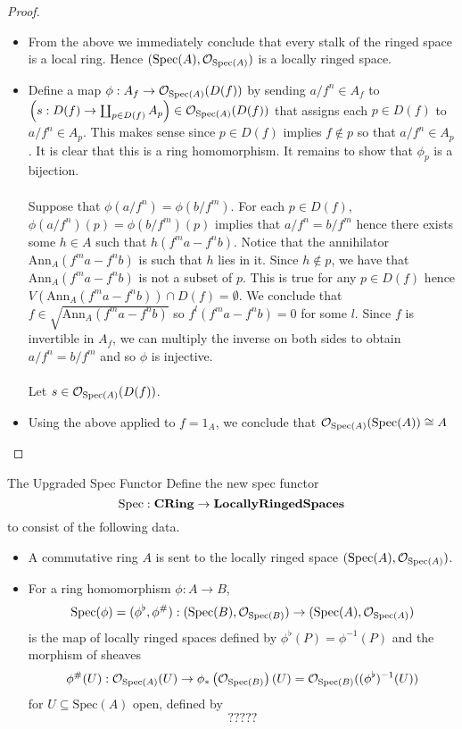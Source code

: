 \documentclass[a4paper]{article}
\begin{document}
\begin{prp}{}{}
\begin{proof}
\begin{itemize}
\item From the above we immediately conclude that every stalk of the ringed space is a local ring. Hence $(\text{Spec}(A),\mathcal{O}_{\text{Spec}(A)})$ is a locally ringed space. 

\item Define a map $\phi:A_f\to\mathcal{O}_{\text{Spec}(A)}(D(f))$ by sending $a/f^n\in A_f$ to $\left(s:D(f)\to\coprod_{p\in D(f)}A_p\right)\in\mathcal{O}_{\text{Spec}(A)}(D(f))$ that assigns each $p\in D(f)$ to $a/f^n\in A_p$. This makes sense since $p\in D(f)$ implies $f\notin p$ so that $a/f^n\in A_p$. It is clear that this is a ring homomorphism. It remains to show that $\phi_p$ is a bijection. \\~\\

Suppose that $\phi(a/f^n)=\phi(b/f^m)$. For each $p\in D(f)$, $\phi(a/f^n)(p)=\phi(b/f^m)(p)$ implies that $a/f^n=b/f^m$ hence there exists some $h\in A$ such that $h(f^ma-f^nb)$. Notice that the annihilator $\text{Ann}_A(f^ma-f^nb)$ is such that $h$ lies in it. Since $h\notin p$, we have that $\text{Ann}_A(f^ma-f^nb)$ is not a subset of $p$. This is true for any $p\in D(f)$ hence $V(\text{Ann}_A(f^ma-f^nb))\cap D(f)=\emptyset$. We conclude that $f\in\sqrt{\text{Ann}_A(f^ma-f^nb)}$ so $f^l(f^ma-f^nb)=0$ for some $l$. Since $f$ is invertible in $A_f$, we can multiply the inverse on both sides to obtain $a/f^n=b/f^m$ and so $\phi$ is injective. \\~\\

Let $s\in\mathcal{O}_{\text{Spec}(A)}(D(f))$. 

\item Using the above applied to $f=1_A$, we conclude that $\mathcal{O}_{\text{Spec}(A)}(\text{Spec}(A))\cong A$
\end{itemize}
\end{proof}
\end{prp}

\begin{defn}{The Upgraded Spec Functor}{} Define the new spec functor $$\text{Spec}:\bold{CRing}\to\bold{Locally Ringed Spaces}$$ to consist of the following data. 
\begin{itemize}
\item A commutative ring $A$ is sent to the locally ringed space $(\text{Spec}(A),\mathcal{O}_{\text{Spec}(A)})$. 
\item For a ring homomorphism $\phi:A\to B$, $$\text{Spec}(\phi)=(\phi^\flat,\phi^\#):(\text{Spec}(B),\mathcal{O}_{\text{Spec}(B)})\to(\text{Spec}(A),\mathcal{O}_{\text{Spec}(A)})$$ is the map of locally ringed spaces defined by $\phi^\flat(P)=\phi^{-1}(P)$ and the morphism of sheaves $$\phi^\#(U):\mathcal{O}_{\text{Spec}(A)}(U)\to\phi_\ast\left(\mathcal{O}_{\text{Spec}(B)}\right)(U)=\mathcal{O}_{\text{Spec}(B)}((\phi^\flat)^{-1}(U))$$ for $U\subseteq\text{Spec}(A)$ open, defined by $$?????$$
\end{itemize}
\end{defn}
\end{document}
